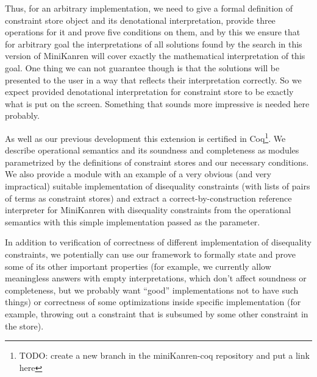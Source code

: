 \documentclass[submission,copyright,creativecommons]{eptcs}
\begin{document}
Thus, for an arbitrary implementation, we need to give a formal definition of constraint store object and its denotational interpretation, provide three operations for it and prove five conditions on them, and by this we ensure that for arbitrary goal the interpretations of all solutions found by the search in this version of MiniKanren will cover exactly the mathematical interpretation of this goal. One thing we can not guarantee though is that the solutions will be presented to the user in a way that reflects their interpretation correctly. So we expect provided denotational interpretation for constraint store to be exactly what is put on the screen. {\color{red} Something that sounds more impressive is needed here probably.}

As well as our previous development this extension is certified in Coq\footnote{\color{red} TODO: create a new branch in the miniKanren-coq repository and put a link here}. We describe operational semantics and its soundness and completeness as modules parametrized by the definitions of constraint stores and our necessary conditions. We also provide a module with an example of a very obvious (and very impractical) suitable implementation of disequality constraints (with lists of pairs of terms as constraint stores) and extract a correct-by-construction reference interpreter for MiniKanren with disequality constraints from the operational semantics with this simple implementation passed as the parameter.

In addition to verification of correctness of different implementation of disequality constraints, we potentially can use our framework to formally state and prove some of its other important properties (for example, we currently allow meaningless answers with empty interpretations, which don't affect soundness or completeness, but we probably want ``good'' implementations not to have such things) or correctness of some optimizations inside specific implementation (for example, throwing out a constraint that is subsumed by some other constraint in the store).

\pagebreak
\end{document}
